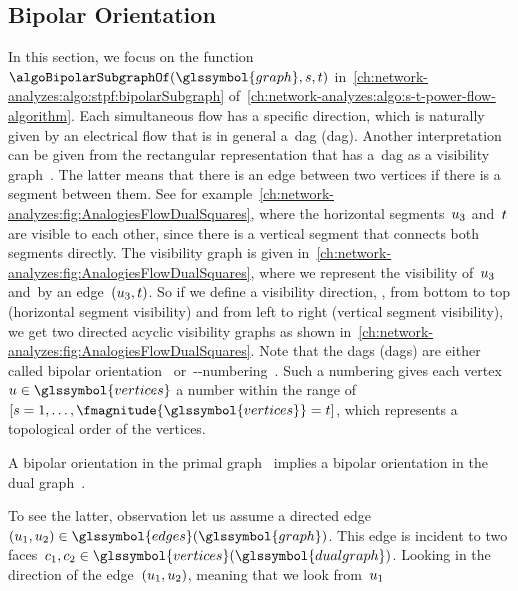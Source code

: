 \subsection{Bipolar Orientation}
\label{ch:network-analyzes:sec:bipolar-orientation}
% 
In this section, we focus on the function~$\algoBipolarSubgraphOf(
\glssymbol{graph},\source,\sink)$
in~\cref{ch:network-analyzes:algo:stpf:bipolarSubgraph}
of~\cref{ch:network-analyzes:algo:s-t-power-flow-algorithm}. 
% 
Each simultaneous flow has a specific direction, which is naturally given by an
electrical flow that is in general a~\acrlong{dag} (\gls{dag}). Another
interpretation can be given from the rectangular representation that has
a~\gls{dag} as a visibility graph~\parencite[pp.12f.]{Fel13}. The latter means
that there is an edge between two vertices if there is a segment between them.
See for
example~\cref{ch:network-analyzes:fig:AnalogiesFlowDualSquares},
where the horizontal segments~$u_3$ and~$t$ are visible to each
other, since there is a vertical segment that connects both segments directly.
The visibility graph is given
in~\cref{ch:network-analyzes:fig:AnalogiesFlowDualSquares}, where we
represent the visibility of~$u_3$ and~\sink by an edge~$
(u_3,t)$. So if we define a visibility direction, \eg, from bottom to
top (horizontal segment visibility) and from left to right (vertical segment
visibility), we get two directed acyclic visibility graphs as shown
in~\cref{ch:network-analyzes:fig:AnalogiesFlowDualSquares}. Note that
the \acrlong{dag}s (\gls{dag}s) are either called bipolar
orientation~\parencite{Fra95} or~\source-\sink-numbering~\parencite{Eve76}. Such
a numbering gives each vertex~$\vertexa\in\glssymbol{vertices}$ a number within
the range of~$[\source=1,\dots,\fmagnitude{\glssymbol{vertices}}=\sink]$, which
represents a topological order of the vertices.
%
\begin{observation}
    A bipolar orientation in the primal graph~ implies a
    bipolar orientation in the dual graph~.
\end{observation}
% 
To see the latter, observation let us assume a directed edge~$
(\vertexa_1,\vertexa_2)\in\glssymbol{edges}(\glssymbol{graph})$. This edge is incident to two
faces~$\cycle_1,\cycle_2\in\glssymbol{vertices}(\glssymbol{dualgraph})$. Looking in the direction of
the edge~$(u_1,u_2)$, meaning that we look from~$u_1$
